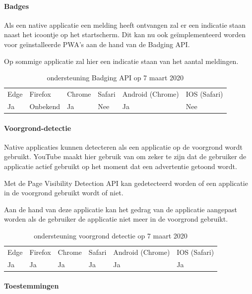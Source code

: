 \paragraph{Badges}

Als een native applicatie een melding heeft ontvangen zal er een indicatie staan naast het icoontje op het startscherm. Dit kan nu ook geïmplementeerd worden voor geïnstalleerde PWA's aan de hand van de Badging API. \autocite{LePage2020a}

Op sommige applicatie zal hier een indicatie staan van het aantal meldingen.
\begin{table}[H]
	\centering
	\begin{tabular}{llllll}
		Edge & Firefox & Chrome & Safari & Android (Chrome) & IOS (Safari) \\
		Ja   & Onbekend      &  Ja     & Nee     & Ja               & Nee          
	\end{tabular}	
	\caption{ondersteuning Badging API op 7 maart 2020}
\end{table}

\paragraph{Voorgrond-detectie }

Native applicaties kunnen detecteren als een applicatie op de voorgrond wordt gebruikt. YouTube maakt hier gebruik van om zeker te zijn dat de gebruiker de applicatie actief gebruikt op het moment dat een advertentie getoond wordt.

Met de Page Visibility Detection API \autocite{Grigorik2017} kan gedetecteerd worden of een applicatie in de voorgrond gebruikt wordt of niet. 

Aan de hand van deze applicatie kan het gedrag van de applicatie aangepast worden als de gebruiker de applicatie niet meer in de voorgrond gebruikt.

\begin{table}[H]
	\centering
	\begin{tabular}{llllll}
		Edge & Firefox & Chrome & Safari & Android (Chrome) & IOS (Safari) \\
		Ja   & Ja      &  Ja     & Ja     & Ja               & Ja          
	\end{tabular}	
	\caption{ondersteuning voorgrond detectie op 7 maart 2020}
\end{table}


\paragraph{Toestemmingen}

